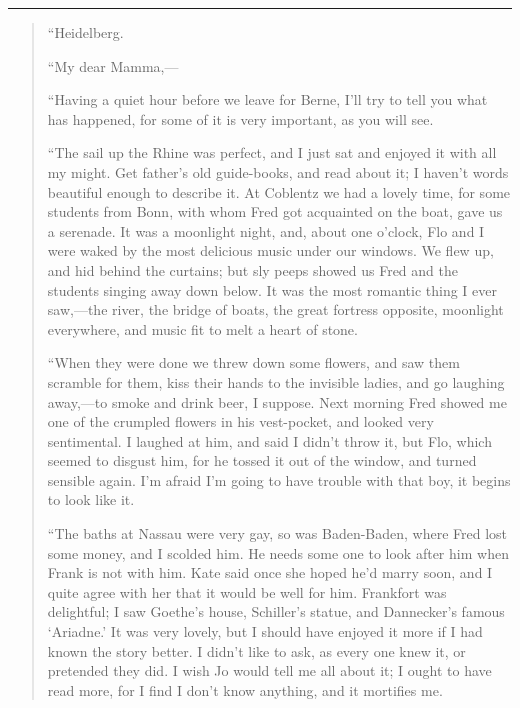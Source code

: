 \begin{center}\rule{0.5\linewidth}{0.5pt}\end{center}

\begin{quote}
``Heidelberg.

``My dear Mamma,---

``Having a quiet hour before we leave for Berne, I'll try
to tell you what has happened, for some of it is very important, as you
will see.

``The sail up the Rhine was perfect, and I just sat and enjoyed it with
all my might. Get father's old guide-books, and read
about it; I haven't words beautiful enough to describe
it. At Coblentz we had a lovely time, for some students from Bonn, with
whom Fred got acquainted on the boat, gave us a serenade. It was a
moonlight night, and, about one o'clock, Flo and I were
waked by the most delicious music under our windows. We flew up, and hid
behind the curtains; but sly peeps showed us Fred and the students
singing away down below. It was the most romantic thing I ever
saw,---the river, the bridge of boats, the great fortress opposite,
moonlight everywhere, and music fit to melt a heart of stone.

``When they were done we threw down some flowers, and saw them scramble
for them, kiss their hands to the invisible ladies, and go laughing
away,---to smoke and drink beer, I suppose. Next morning Fred showed me
one of the crumpled flowers in his vest-pocket, and looked very
sentimental. I laughed at him, and said I didn't throw
it, but Flo, which seemed to disgust him, for he tossed it out of the
window, and turned sensible again. I'm afraid
I'm going to have trouble with that boy, it begins to
look like it.

``The baths at Nassau were very gay, so was Baden-Baden, where Fred lost
some money, and I scolded him. He needs some one to look after him when
Frank is not with him. Kate said once she hoped he'd
marry soon, and I quite agree with her that it would be well for him.
Frankfort was delightful; I saw Goethe's house,
Schiller's statue, and Dannecker's
famous `Ariadne.' It was very lovely,
but I should have enjoyed it more if I had known the story better. I
didn't like to ask, as every one knew it, or pretended
they did. I wish Jo would tell me all about it; I ought to have read
more, for I find I don't know anything, and it mortifies
me.


\end{quote}
